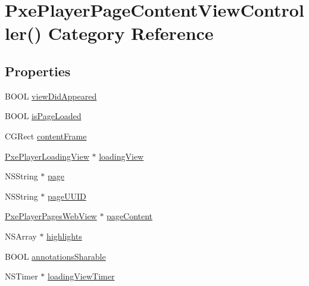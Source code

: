 \hypertarget{category_pxe_player_page_content_view_controller_07_08}{\section{Pxe\-Player\-Page\-Content\-View\-Controller() Category Reference}
\label{category_pxe_player_page_content_view_controller_07_08}
}
\subsection*{Properties}
\begin{DoxyCompactItemize}
\item 
B\-O\-O\-L \hyperlink{category_pxe_player_page_content_view_controller_07_08_af3d11a7f11a11796661c27580d6ce029}{view\-Did\-Appeared}
\item 
B\-O\-O\-L \hyperlink{category_pxe_player_page_content_view_controller_07_08_afd96b3c3ba599231417556b69275bdbc}{is\-Page\-Loaded}
\item 
C\-G\-Rect \hyperlink{category_pxe_player_page_content_view_controller_07_08_a2ad90ffea6617ce2f6ca5d342290ce56}{content\-Frame}
\item 
\hyperlink{interface_pxe_player_loading_view}{Pxe\-Player\-Loading\-View} $\ast$ \hyperlink{category_pxe_player_page_content_view_controller_07_08_a12806241fb1086aa491618dd59071798}{loading\-View}
\item 
N\-S\-String $\ast$ \hyperlink{category_pxe_player_page_content_view_controller_07_08_a482fc28ef887b97f6a6aefdee082900c}{page}
\item 
N\-S\-String $\ast$ \hyperlink{category_pxe_player_page_content_view_controller_07_08_a6018e38b2c25be9266b21662eb93f0a1}{page\-U\-U\-I\-D}
\item 
\hyperlink{interface_pxe_player_pages_web_view}{Pxe\-Player\-Pages\-Web\-View} $\ast$ \hyperlink{category_pxe_player_page_content_view_controller_07_08_aabac4af63563001986de19c537ba14a7}{page\-Content}
\item 
N\-S\-Array $\ast$ \hyperlink{category_pxe_player_page_content_view_controller_07_08_af669d904b91e14ee5a23586242056f8f}{highlights}
\item 
B\-O\-O\-L \hyperlink{category_pxe_player_page_content_view_controller_07_08_aed72d78725a3cab4c50c195b60681fa0}{annotations\-Sharable}
\item 
N\-S\-Timer $\ast$ \hyperlink{category_pxe_player_page_content_view_controller_07_08_a2dd826b7fd5d227afac08b130812ebb6}{loading\-View\-Timer}
\end{DoxyCompactItemize}



